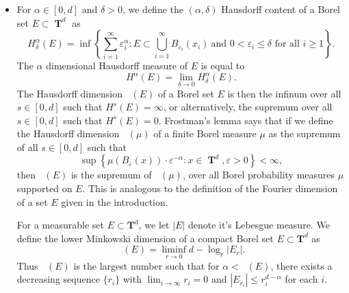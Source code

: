 \documentclass[dvipsnames,letterpaper,12pt]{article}
\numberwithin{equation}{section}
\DeclareMathOperator{\hausdim}{\dim_{\mathbf{H}}}
\DeclareMathOperator{\lowminkdim}{\underline{\dim}_{\mathbf{M}}}
\DeclareMathOperator{\TT}{\mathbf{T}}
\numberwithin{theorem}{section}
\begin{document}
\begin{itemize}
    \item For $\alpha \in [0,d]$ and $\delta > 0$, we define the $(\alpha,\delta)$ Hausdorff content of a Borel set $E \subset \TT^d$ as
    \[ H^\alpha_\delta(E) = \inf \left\{ \sum_{i = 1}^\infty \varepsilon_i^\alpha : E \subset \bigcup_{i = 1}^\infty B_{\varepsilon_i}(x_i)\ \text{and $0 < \varepsilon_i \leq \delta$ for all $i \geq 1$} \right\}. \]
    The $\alpha$ dimensional Hausdorff measure of $E$ is equal to
    \[ H^\alpha(E) = \lim_{\delta \to 0} H^\alpha_\delta(E). \]
    The Hausdorff dimension $\hausdim(E)$ of a Borel set $E$ is then the infinum over all $s \in [0,d]$ such that $H^s(E) = \infty$, or alternatively, the supremum over all $s \in [0,d]$ such that $H^s(E) = 0$. Frostman's lemma says that if we define the Hausdorff dimension $\hausdim(\mu)$ of a finite Borel measure $\mu$ as the supremum of all $s \in [0,d]$ such that
    \[ \sup \left\{ \mu(B_\varepsilon(x)) \cdot \varepsilon^{-\alpha} : x \in \TT^d, \varepsilon > 0 \right\} < \infty, \]
    then $\hausdim(E)$ is the supremum of $\hausdim(\mu)$, over all Borel probability measures $\mu$ supported on $E$. This is analogous to the definition of the Fourier dimension of a set $E$ given in the introduction.


    For a measurable set $E \subset \mathbf{T}^d$, we let $|E|$ denote it's Lebesgue measure. We define the lower Minkowski dimension of a compact Borel set $E \subset \mathbf{T}^d$ as
    \[ \lowminkdim(E) = \liminf_{r \to 0} d - \log_r|E_r|. \]
    Thus $\lowminkdim(E)$ is the largest number such that for $\alpha < \lowminkdim(E)$, there exists a decreasing sequence $\{ r_i \}$ with $\lim_{i \to \infty} r_i = 0$ and $|E_{r_i}| \leq r_i^{d - \alpha}$ for each $i$.


\end{itemize}
\end{document}
